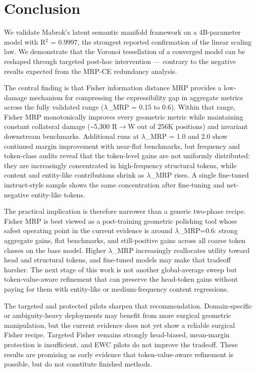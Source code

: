 \documentclass[
  11pt,
]{article}
\begin{document}
\hypertarget{conclusion}{%
\section{Conclusion}\label{conclusion}}

We validate Mabrok's latent semantic manifold framework on a
4B-parameter model with R$^2$ = 0.9997, the strongest reported confirmation
of the linear scaling law. We demonstrate that the Voronoi tessellation
of a converged model can be reshaped through targeted post-hoc
intervention --- contrary to the negative results expected from the
MRP-CE redundancy analysis.

The central finding is that Fisher information distance MRP provides a
low-damage mechanism for compressing the expressibility gap in aggregate
metrics across the fully validated range ($\lambda$\_MRP = 0.15 to 0.6). Within
that range, Fisher MRP monotonically improves every geometric metric
while maintaining constant collateral damage (\textasciitilde5,300 R$\rightarrow$W
out of 256K positions) and invariant downstream benchmarks. Additional
runs at $\lambda$\_MRP = 1.0 and 2.0 show continued margin improvement with
near-flat benchmarks, but frequency and token-class audits reveal that
the token-level gains are not uniformly distributed: they are
increasingly concentrated in high-frequency structural tokens, while
content and entity-like contributions shrink as $\lambda$\_MRP rises. A single
fine-tuned instruct-style sample shows the same concentration after
fine-tuning and net-negative entity-like tokens.

The practical implication is therefore narrower than a generic two-phase
recipe. Fisher MRP is best viewed as a post-training geometric polishing
tool whose safest operating point in the current evidence is around
$\lambda$\_MRP=0.6: strong aggregate gains, flat benchmarks, and still-positive
gains across all coarse token classes on the base model. Higher $\lambda$\_MRP
increasingly reallocates utility toward head and structural tokens, and
fine-tuned models may make that tradeoff harsher. The next stage of this
work is not another global-average sweep but token-value-aware
refinement that can preserve the head-token gains without paying for
them with entity-like or medium-frequency content regressions.

The targeted and protected pilots sharpen that recommendation.
Domain-specific or ambiguity-heavy deployments may benefit from more
surgical geometric manipulation, but the current evidence does not yet
show a reliable surgical Fisher recipe. Targeted Fisher remains strongly
head-biased, mean-margin protection is insufficient, and EWC pilots do
not improve the tradeoff. These results are promising as early evidence
that token-value-aware refinement is possible, but do not constitute
finished methods.
\end{document}
